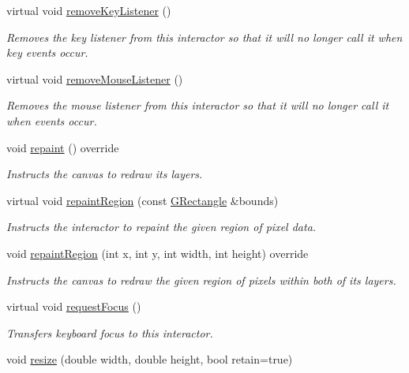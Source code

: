 \begin{DoxyCompactItemize}
virtual void \mbox{\hyperlink{classGInteractor_a43095f41cab3be732b49f29970484b05}{remove\+Key\+Listener}} ()
\begin{DoxyCompactList}\small\item\em Removes the key listener from this interactor so that it will no longer call it when key events occur. \end{DoxyCompactList}\item 
virtual void \mbox{\hyperlink{classGInteractor_aff47f71ce47e688a07c9d38dc92fcc11}{remove\+Mouse\+Listener}} ()
\begin{DoxyCompactList}\small\item\em Removes the mouse listener from this interactor so that it will no longer call it when events occur. \end{DoxyCompactList}\item 
void \mbox{\hyperlink{classGCanvas_afb8dbc55702230f0030e47d6c009697f}{repaint}} () override
\begin{DoxyCompactList}\small\item\em Instructs the canvas to redraw its layers. \end{DoxyCompactList}\item 
virtual void \mbox{\hyperlink{classGDrawingSurface_a769c46fb3e1004aec76e8b0adfa42aa6}{repaint\+Region}} (const \mbox{\hyperlink{structGRectangle}{G\+Rectangle}} \&bounds)
\begin{DoxyCompactList}\small\item\em Instructs the interactor to repaint the given region of pixel data. \end{DoxyCompactList}\item 
void \mbox{\hyperlink{classGCanvas_a63af8fca5bf186367132ecf6af6f5eea}{repaint\+Region}} (int x, int y, int width, int height) override
\begin{DoxyCompactList}\small\item\em Instructs the canvas to redraw the given region of pixels within both of its layers. \end{DoxyCompactList}\item 
virtual void \mbox{\hyperlink{classGInteractor_a519fb2ac767f8b2febbb50b898b8c8cb}{request\+Focus}} ()
\begin{DoxyCompactList}\small\item\em Transfers keyboard focus to this interactor. \end{DoxyCompactList}\item 
void \mbox{\hyperlink{classGCanvas_a090053938117ab698c4c9c1f1cff74a9}{resize}} (double width, double height, bool retain=true)

\end{DoxyCompactItemize}
